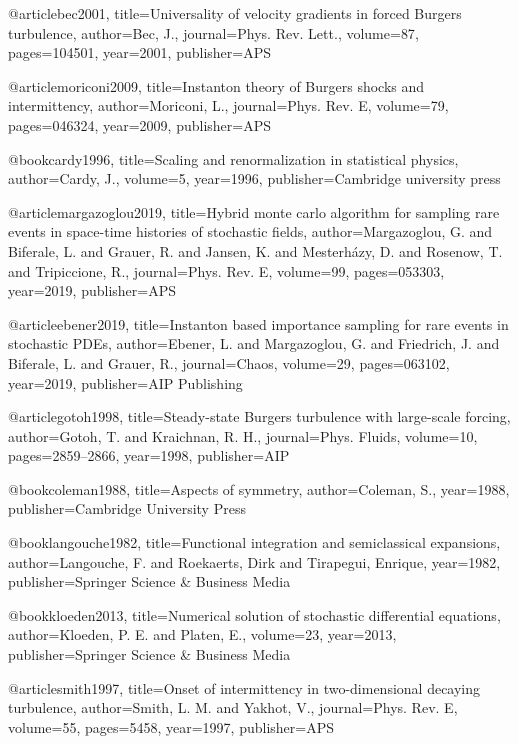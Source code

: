 @article{bec2001,
  title={{Universality of velocity gradients in forced Burgers turbulence}},
  author={Bec, J.},
  journal={Phys. Rev. Lett.},
  volume={87},
  pages={104501},
  year={2001},
  publisher={APS}
}

@article{moriconi2009,
  title={{Instanton theory of Burgers shocks and intermittency}},
  author={Moriconi, L.},
  journal={Phys. Rev. E},
  volume={79},
  pages={046324},
  year={2009},
  publisher={APS}
}

@book{cardy1996,
  title={Scaling and renormalization in statistical physics},
  author={Cardy, J.},
  volume={5},
  year={1996},
  publisher={Cambridge university press}
}

@article{margazoglou2019,
  title={Hybrid monte carlo algorithm for sampling rare events in space-time histories of stochastic fields},
  author={Mar\-ga\-zo\-glou, G. and Bi\-fe\-ra\-le, L. and Gra\-uer, R. and Jan\-sen, K. and Mes\-ter\-h{\'a}\-zy, D. and Ro\-se\-now, T. and Tri\-pi\-cci\-one, R.},
  journal={Phys. Rev. E},
  volume={99},
  pages={053303},
  year={2019},
  publisher={APS}
}

@article{ebener2019,
  title={{Instanton based importance sampling for rare events in stochastic PDEs}},
  author={Ebener, L. and Margazoglou, G. and Friedrich, J. and Biferale, L. and Grauer, R.},
  journal={Chaos},
  volume={29},
  pages={063102},
  year={2019},
  publisher={AIP Publishing}
}

@article{gotoh1998,
  title={{Steady-state Burgers turbulence with large-scale forcing}},
  author={Gotoh, T. and Kraichnan, R. H.},
  journal={Phys. Fluids},
  volume={10},
  pages={2859--2866},
  year={1998},
  publisher={AIP}
}

@book{coleman1988,
  title={Aspects of symmetry},
  author={Coleman, S.},
  year={1988},
  publisher={Cambridge University Press}
}

@book{langouche1982,
  title={Functional integration and semiclassical expansions},
  author={Langouche, F. and Roekaerts, Dirk and Tirapegui, Enrique},
  year={1982},
  publisher={Springer Science \& Business Media}
}


@book{kloeden2013,
  title={Numerical solution of stochastic differential equations},
  author={Kloeden, P. E. and Platen, E.},
  volume={23},
  year={2013},
  publisher={Springer Science \& Business Media}
}

@article{smith1997,
  title={Onset of intermittency in two-dimensional decaying turbulence},
  author={Smith, L. M. and Yakhot, V.},
  journal={Phys. Rev. E},
  volume={55},
  pages={5458},
  year={1997},
  publisher={APS}
}

